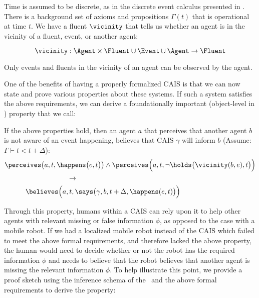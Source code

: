 Time is assumed to be discrete, as in the
discrete event calculus presented in \cite{mueller_commonsense_2014}.  There is a
background set of axioms and propositions $\Gamma(t)$ that is
operational at time $t$.  We have a fluent $\vicinity$ that tells us
whether an agent is in the vicinity of a fluent, event, or another
agent:

$$\vicinity: \Agent \times \Fluent \cup \Event \cup \Agent \rightarrow
\Fluent $$

\noindent
Only events and fluents in the vicinity of an agent can be
observed by the agent.


One of the benefits of having a properly formalized CAIS is that we
can now state and prove various properties about these systems. If such
a system satisfies the above requirements, we can derive a foundationally
important (object-level in \CEC) property that we call:

\begin{small}
\begin{mdframed}[linecolor=white, frametitle=Expectation of Usefulness , frametitlebackgroundcolor=gray!25,
  backgroundcolor=gray!10, nobreak=true ,roundcorner=8pt]
  If the above properties hold, then an agent $a$ that perceives that
  another agent $b$ is not aware of an event happening, believes that
  CAIS $\gamma$ will inform $b$ (Assume: $\Gamma \vdash t < t + \Delta$):
\begin{equation*}
\begin{aligned}
&\perceives\big(a, t, \happens\big(e, t\big)\big) \land \perceives\Big(a, t, \lnot \holds\big(\vicinity(b, e),t\big)\Big) \\
& \hspace{90pt} \rightarrow \\
& \hspace{30pt} \believes\Big(a, t, \says\big(\gamma, b, t +\Delta,
\happens(e, t)\big)\Big)\\
\end{aligned}
\end{equation*}
\end{mdframed}
\end{small}

Through this property, humans within a CAIS can rely upon it to help other
agents with relevant missing or false information $\phi$, as opposed to the
case with a mobile robot. If we had a localized mobile robot instead of the
CAIS which failed to meet the above formal requirements, and therefore lacked
the above property, the human would need to decide whether or not the robot has
the required information $\phi$ and needs to believe that the robot believes that
another agent is missing the relevant information $\phi$. To help illustrate this
point, we provide a proof sketch using the inference schema of the \CEC\ and
the above formal requirements to derive the property:


